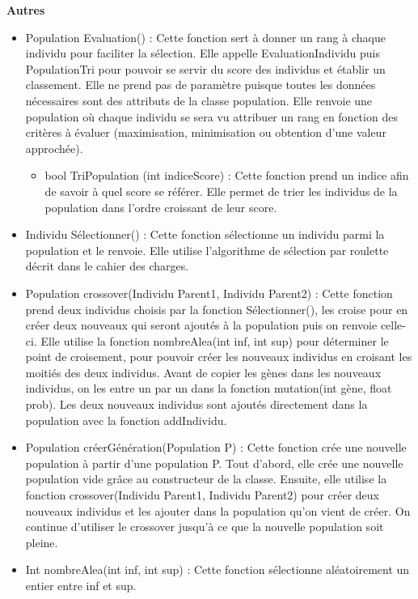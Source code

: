 \documentclass[a4paper,11pt]{article}
\begin{document}
			\textbf{Autres}
				\begin{itemize}
							\item Population Evaluation() : Cette fonction sert à donner un rang à chaque individu pour faciliter la sélection. 
								Elle appelle EvaluationIndividu puis PopulationTri pour pouvoir se servir du score des individus et établir un classement. 
								Elle ne prend pas de paramètre puisque toutes les données nécessaires sont des attributs de la classe population. 
								Elle renvoie une population où chaque individu se sera vu attribuer un rang en fonction des critères à évaluer (maximisation, minimisation ou obtention d’une valeur approchée).\vspace{0.2cm}
								\begin{itemize}
								\item bool TriPopulation (int indiceScore) : Cette fonction prend un indice afin de savoir à quel score se référer. 
									Elle permet de trier les individus de la population dans l’ordre croissant de leur score.\vspace{0.2cm}
								\end{itemize}
							
							\item Individu Sélectionner() : Cette fonction sélectionne un individu parmi la population et le renvoie. 
								Elle utilise l’algorithme de sélection par roulette décrit dans le cahier des charges.\vspace{0.2cm}
								
							\item Population crossover(Individu Parent1, Individu Parent2) : Cette fonction prend deux individus choisis par la fonction Sélectionner(), les croise pour en créer deux nouveaux qui seront ajoutés à la population puis on renvoie celle-ci. 
								Elle utilise la fonction nombreAlea(int inf, int sup) pour déterminer le point de croisement, pour pouvoir créer les nouveaux individus en croisant les moitiés des deux individus.
								Avant de copier les gènes dans les nouveaux individus, on les entre un par un dans la fonction mutation(int gène, float prob). 
								Les deux nouveaux individus sont ajoutés directement dans la population  avec la fonction addIndividu.\vspace{0.2cm}
							
							\item Population créerGénération(Population P) : Cette fonction crée une nouvelle population à partir d’une population P.
								Tout d’abord, elle crée une nouvelle population vide grâce au constructeur de la classe. 
								Ensuite, elle utilise la fonction crossover(Individu Parent1, Individu Parent2) pour créer deux nouveaux individus et les ajouter dans la population qu’on vient de créer.
								On continue d’utiliser le crossover jusqu’à ce que la nouvelle population soit pleine.\vspace{0.2cm}
							
							\item Int nombreAlea(int inf, int sup) : Cette fonction sélectionne aléatoirement un entier entre inf et sup.
					\end{itemize}
		
\end{document}
